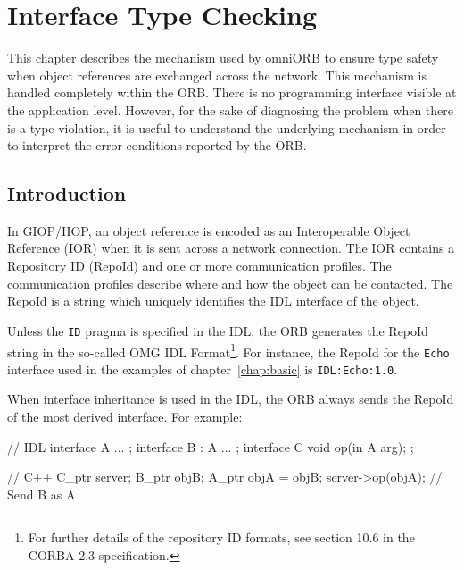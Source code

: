 \documentclass[11pt,twoside,a4paper]{book}
\newcommand{\intf}[1]{\texttt{#1}}
\newcommand{\code}[1]{\texttt{#1}}
\begin{document}
\chapter{Interface Type Checking}
\label{ch_intf}

This chapter describes the mechanism used by omniORB to ensure type
safety when object references are exchanged across the network. This
mechanism is handled completely within the ORB. There is no
programming interface visible at the application level. However, for
the sake of diagnosing the problem when there is a type violation, it
is useful to understand the underlying mechanism in order to interpret
the error conditions reported by the ORB.

\section{Introduction}

In GIOP/IIOP, an object reference is encoded as an Interoperable
Object Reference (IOR) when it is sent across a network connection.
The IOR contains a Repository ID (RepoId) and one or more
communication profiles. The communication profiles describe where and
how the object can be contacted. The RepoId is a string which uniquely
identifies the IDL interface of the object.

Unless the \code{ID} pragma is specified in the IDL, the ORB generates
the RepoId string in the so-called OMG IDL Format\footnote{For further
details of the repository ID formats, see section 10.6 in the CORBA
2.3 specification.}. For instance, the RepoId for the \intf{Echo}
interface used in the examples of chapter~\ref{chap:basic} is
\texttt{IDL:Echo:1.0}.

When interface inheritance is used in the IDL, the ORB always sends the
RepoId of the most derived interface. For example:

\begin{idllisting}
   // IDL
   interface A {
     ...
   };
   interface B : A {
     ...
   };
   interface C {
      void op(in A arg);
   };
\end{idllisting}

\begin{cxxlisting}
   // C++
   C_ptr server;
   B_ptr objB;
   A_ptr objA = objB;
   server->op(objA);  // Send B as A
\end{cxxlisting}
\end{document}

